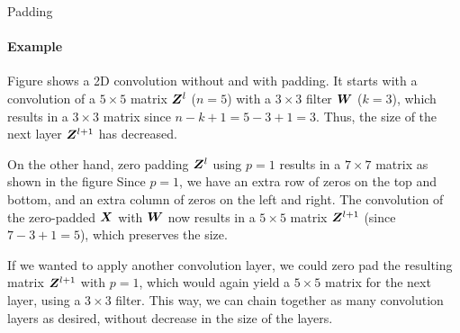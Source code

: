 \begin{frame}{Padding}
\framesubtitle{Example}
Figure shows a 2D convolution without and with
    padding. %
It starts with a convolution of a $5
    \times 5$ matrix ${\boldsymbol Z}^l$ ($n=5$) with a $3 \times 3$ filter ${\boldsymbol W}$
    ($k=3$), which results in a $3 \times 3$ matrix since $n-k+1 = 5-3+1
    = 3$. Thus, the size of the next layer ${\boldsymbol Z}^{l+1}$ has
    decreased.


\medskip


    On the other hand, zero padding ${\boldsymbol Z}^l$ using $p=1$ results in a $7 \times
    7$ matrix as shown in the figure %
Since $p=1$, we
    have an extra row of zeros on the top and bottom, and an extra
    column of zeros on the left and right. The convolution of the
    zero-padded ${\boldsymbol X}$ with ${\boldsymbol W}$ now results in a $5 \times 5$ matrix
    ${\boldsymbol Z}^{l+1}$
    (since $7-3+1 = 5$), which preserves the size. 


\medskip

    
    If we wanted to apply another convolution layer, we could
    zero pad the resulting matrix ${\boldsymbol Z}^{l+1}$ with $p=1$, which would again yield a
    $5 \times 5$ matrix for the next layer, using a $3 \times 3$ filter. 
    This way, we can
    chain together as many convolution layers as desired, without decrease in the
    size of the layers.
\end{frame}
%
%
%

